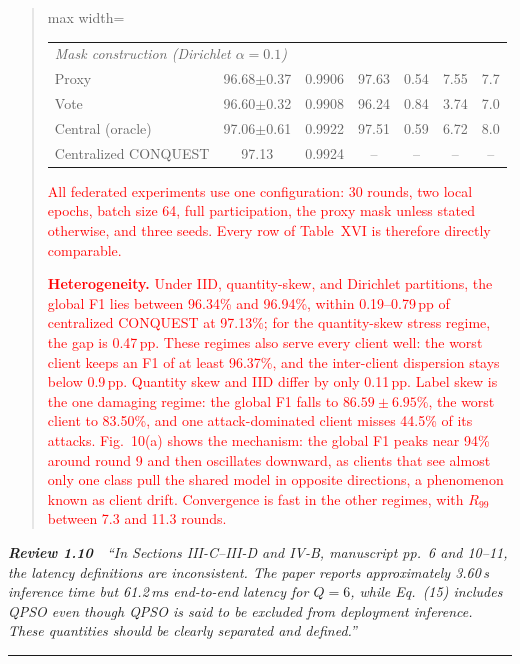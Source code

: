\documentclass[11pt]{article}
\newenvironment{excerpt}{\begin{quote}\sloppy}{\end{quote}}
\newcommand{\review}[2]{\par\bigskip\noindent\textbf{\textit{Review #1}}\ \ \textit{``#2''}\par\smallskip\hrule\medskip}
\begin{document}
\begin{excerpt}
\begin{table}[H]
\begin{adjustbox}{max width=\linewidth}
\begin{tabular}{lcccccc}
\midrule
\multicolumn{7}{l}{\textit{Mask construction (Dirichlet $\alpha{=}0.1$)}} \\
Proxy & 96.68$\pm$0.37 & 0.9906 & 97.63 & 0.54 & 7.55 & 7.7 \\
Vote & 96.60$\pm$0.32 & 0.9908 & 96.24 & 0.84 & 3.74 & 7.0 \\
Central (oracle) & 97.06$\pm$0.61 & 0.9922 & 97.51 & 0.59 & 6.72 & 8.0 \\
\midrule
Centralized CONQUEST & 97.13 & 0.9924 & -- & -- & -- & -- \\
\hline\toprule
\end{tabular}
\end{adjustbox}
\end{table}

\textcolor{red}{All federated experiments
use one configuration: 30 rounds, two local epochs, batch size 64,
full participation, the proxy mask unless stated otherwise, and three
seeds. Every row of Table~XVI is
therefore directly comparable.}

\textcolor{red}{\textbf{Heterogeneity.} Under IID,
quantity-skew, and Dirichlet partitions, the global F1 lies between
96.34\% and 96.94\%, within 0.19--0.79\,pp of centralized CONQUEST at
97.13\%; for the quantity-skew stress regime, the gap is 0.47\,pp.
These regimes also serve every client well: the worst client keeps an
F1 of at least 96.37\%, and the inter-client dispersion stays below
0.9\,pp. Quantity skew and IID differ by only 0.11\,pp. Label skew is the one
damaging regime: the global F1 falls to $86.59\pm6.95\%$, the worst
client to 83.50\%, and one attack-dominated client misses 44.5\% of
its attacks. Fig.~10(a) shows the mechanism:
the global F1 peaks near 94\% around round 9 and then oscillates
downward, as clients that see almost only one class pull the shared
model in opposite directions, a phenomenon known as client drift.
Convergence is fast in the other regimes, with $R_{99}$ between 7.3
and 11.3 rounds.}
\end{excerpt}

\review{1.10}{In Sections III-C--III-D and IV-B, manuscript pp.~6 and 10--11, the latency definitions are inconsistent. The paper reports approximately 3.60\,s inference time but 61.2\,ms end-to-end latency for $Q=6$, while Eq.~(15) includes QPSO even though QPSO is said to be excluded from deployment inference. These quantities should be clearly separated and defined.}
\end{document}
